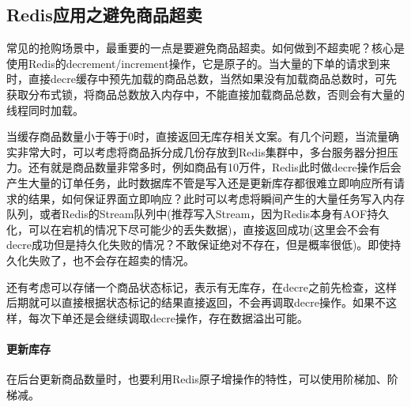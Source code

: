 \documentclass[../../../interview-questions.tex]{subfiles}
\begin{document}
\subsection{Redis应用之避免商品超卖}

常见的抢购场景中，最重要的一点是要避免商品超卖。如何做到不超卖呢？核心是使用Redis的decrement/increment操作，它是原子的。当大量的下单的请求到来时，直接decre缓存中预先加载的商品总数，当然如果没有加载商品总数时，可先获取分布式锁，将商品总数放入内存中，不能直接加载商品总数，否则会有大量的线程同时加载。

当缓存商品数量小于等于0时，直接返回无库存相关文案。有几个问题，当流量确实非常大时，可以考虑将商品拆分成几份存放到Redis集群中，多台服务器分担压力。还有就是商品数量非常多时，例如商品有10万件，Redis此时做decre操作后会产生大量的订单任务，此时数据库不管是写入还是更新库存都很难立即响应所有请求的结果，如何保证界面立即响应？此时可以考虑将瞬间产生的大量任务写入内存队列，或者Redis的Stream队列中(推荐写入Stream，因为Redis本身有AOF持久化，可以在宕机的情况下尽可能少的丢失数据)，直接返回成功(这里会不会有decre成功但是持久化失败的情况？不敢保证绝对不存在，但是概率很低)。即使持久化失败了，也不会存在超卖的情况。

还有考虑可以存储一个商品状态标记，表示有无库存，在decre之前先检查，这样后期就可以直接根据状态标记的结果直接返回，不会再调取decre操作。如果不这样，每次下单还是会继续调取decre操作，存在数据溢出可能。

\paragraph{更新库存}

在后台更新商品数量时，也要利用Redis原子增操作的特性，可以使用阶梯加、阶梯减。
\end{document}
